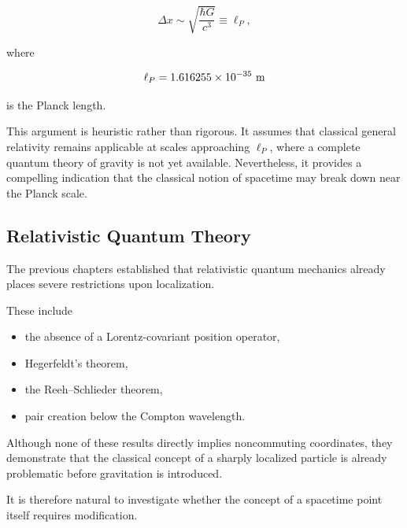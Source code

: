 \begin{equation}
\Delta x
\sim
\sqrt{\frac{\hbar G}{c^3}}
\equiv
\ell_P,
\end{equation}

where

\begin{equation}
\ell_P
=
1.616255\times10^{-35}\ {\rm m}
\end{equation}

is the Planck length.

This argument is heuristic rather than rigorous. It assumes that classical
general relativity remains applicable at scales approaching $\ell_P$, where a
complete quantum theory of gravity is not yet available. Nevertheless, it
provides a compelling indication that the classical notion of spacetime may
break down near the Planck scale.


\subsection{Relativistic Quantum Theory}

The previous chapters established that relativistic quantum mechanics already
places severe restrictions upon localization.

These include

\begin{itemize}

\item the absence of a Lorentz-covariant position operator,

\item Hegerfeldt's theorem,

\item the Reeh--Schlieder theorem,

\item pair creation below the Compton wavelength.

\end{itemize}

Although none of these results directly implies noncommuting coordinates, they
demonstrate that the classical concept of a sharply localized particle is
already problematic before gravitation is introduced.

It is therefore natural to investigate whether the concept of a spacetime
point itself requires modification.
